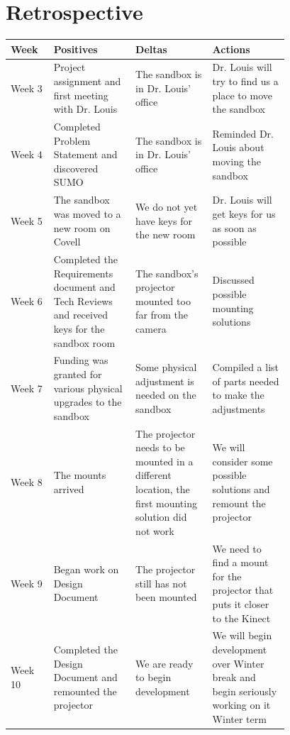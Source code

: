 \documentclass[letterpaper, 10pt, onecolumn, draftclsnofoot]{IEEEtran}
\begin{document}
\section{Retrospective}
        \begin{center}
        \begin{tabular}{|p{0.1\linewidth}|p{0.225\linewidth}|p{0.225\linewidth}|p{0.225\linewidth}|}
            \hline
            \textbf{Week} & \textbf{Positives} & \textbf{Deltas} & \textbf{Actions} \\
            \hline
            Week 3 & Project assignment and first meeting with Dr. Louis & The sandbox is in Dr. Louis' office & Dr. Louis will try to find us a place to move the sandbox \\
            \hline
            Week 4 & Completed Problem Statement and discovered SUMO\cite{SUMO} & The sandbox is in Dr. Louis' office &  Reminded Dr. Louis about moving the sandbox \\
            \hline
            Week 5 & The sandbox was moved to a new room on Covell & We do not yet have keys for the new room & Dr. Louis will get keys for us as soon as possible \\
            \hline
            Week 6 & Completed the Requirements document and Tech Reviews and received keys for the sandbox room & The sandbox's projector mounted too far from the camera & Discussed possible mounting solutions \\
            \hline
            Week 7 & Funding was granted for various physical upgrades to the sandbox & Some physical adjustment is needed on the sandbox & Compiled a list of parts needed to make the adjustments \\
            \hline
            Week 8 & The mounts arrived & The projector needs to be mounted in a different location, the first mounting solution did not work & We will consider some possible solutions and remount the projector \\
            \hline
            Week 9 & Began work on Design Document & The projector still has not been mounted & We need to find a mount for the projector that puts it closer to the Kinect \\
            \hline
            Week 10 & Completed the Design Document and remounted the projector & We are ready to begin development & We will begin development over Winter break and begin seriously working on it Winter term \\
            \hline
        \end{tabular}
        \end{center}
\end{document}

